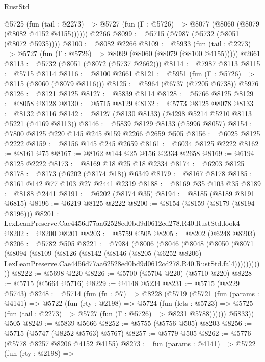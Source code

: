 \begin{lexlean}{RustStd}
\begin{coremodule}
    @5725
      (fun (tail : @2273) => @5727 (fun (Γ : @5726) => @8077 (@8060 (@8079 (@8082 @4152 @4155))))))
    @2266
@8099 := @5715 (@7987 (@5732 (@8051 (@8072 @5935))))
@8100 := @8082 @2266
@8109 := @5933
    (fun (tail : @2273) => @5727 (fun (Γ : @5726) => @8099 (@8060 (@8079 (@8100 @4155)))))
    @2661
@8113 := @5732 (@8051 (@8072 (@5737 @2662)))
@8114 := @7987 @8113
@8115 := @5715 @8114
@8116 := @8100 @2661
@8121 := @5951 (fun (Γ : @5726) => @8115 (@8060 (@8079 @8116)))
@8125 := @5964 (@6737 (@7205 @6738)) @5976
@8126 := @8121 @8125
@8127 := @5839 @8114
@8128 := @5766 @8125
@8129 := @8058 @8128
@8130 := @5715 @8129
@8132 := @5773 @8125 @8078
@8133 := @8132 @8116
@8142 := @8127 (@8130 @8133) (@4298 @5214 @5210 @8113 @5221 (@4169 @8113))
@8146 := @5839 @8129 @8133 (@5996 @8057)
@8154 := @7800 @8125 @220 @145 @245 @159 @2266 @2659 @505
@8156 := @6025 @8125 @2222
@8159 := @8156 @145 @245 @2659
@8161 := @6034 @8125 @2222
@8162 := @8161 @75
@8167 := @8162 @144 @25 @156 @2334 @2658
@8169 := @6194 @8125 @2222
@8173 := @8169 @18 @25 @18 @2334
@8174 := @6203 @8125
@8178 := @8173 (@6202 (@8174 @18)) @6349
@8179 := @8167 @8178
@8185 := @8161 @142 @77 @103 @27 @2441 @2319
@8188 := @8169 @35 @103 @35
@8189 := @8188 @2441
@8191 := @6202 (@8174 @35)
@8194 := @8185 (@8189 @8191 @6815)
@8196 := @6219 @8125 @2222
@8200 := @8154 (@8159 (@8179 (@8194 @8196)))
@8201 := LexLeanPreserve.Cae4456d77aa62528ed0bd9d0612cd278.R40.RustStd.look4
@8202 := @8200 @8201
@8203 := @5759 @505
@8205 := @8202 (@6248 @8203)
@8206 := @5782 @505
@8221 := @7984
    (@8006
      (@8046
        (@8048
          (@8050
            (@8071
              (@8094
                (@8109
                  (@8126
                    (@8142
                      (@8146
                        (@8205
                          (@6252 @8206)
                          LexLeanPreserve.Cae4456d77aa62528ed0bd9d0612cd278.R40.RustStd.fal4)))))))))))
@8222 := @5698 @220
@8226 := @5700 (@5704 @220) (@5710 @220)
@8228 := @5715 (@5664 @5716)
@8229 := @4148 @5234
@8231 := @5715 (@8229 @5743)
@8248 := @5714
    (fun (fn : @7) =>
    @8228
      (@5719
        (@5721
          (fun (params : @4141) =>
          @5722
            (fun (rty : @2198) =>
            @5724
              (fun (lets : @5723) =>
              @5725 (fun (tail : @2273) => @5727 (fun (Γ : @5726) => @8231 @5788))))))
        @5833))
    @505
@8249 := @5839 @5666
@8252 := @5755 (@5756 @505) @8203
@8256 := @5715 (@5747 (@8252 @5763) @5767)
@8257 := @5779 @505
@8262 := @5776 (@5778 @8257 @8206 @4152 @4155)
@8273 := fun (params : @4141) =>
  @5722
    (fun (rty : @2198) =>

\end{coremodule}
\end{lexlean}

